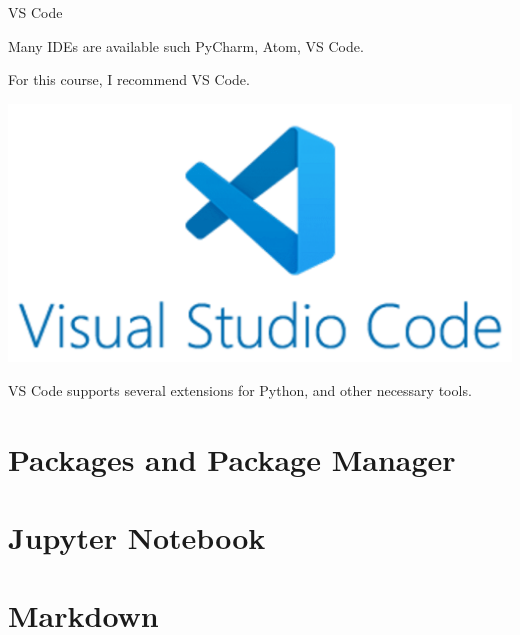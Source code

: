 \documentclass[aspectratio=169,xcolor=dvipsnames,svgnames,x11names,fleqn]{beamer}
\begin{document}
\begin{frame}{VS Code}
    
    Many IDEs are available such PyCharm, Atom, VS Code.

    \vspace{10pt}

    For this course, I recommend VS Code.

    \begin{center}
        \includegraphics[width=\textwidth,height=0.45\textheight,keepaspectratio]{figures/vscode.png}
    \end{center}

    VS Code supports several extensions for Python, and other necessary tools.

\end{frame}






\section{Packages and Package Manager}

\begin{frame}
    \sectionpage
\end{frame}


\section{Jupyter Notebook}

\begin{frame}
    \sectionpage
\end{frame}


\section{Markdown}
\end{document}
